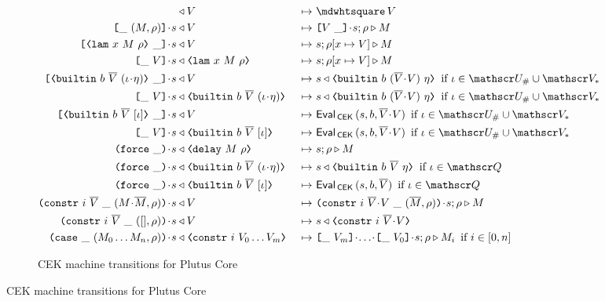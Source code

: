 \begin{figure}[H]
\begin{subfigure}[c]{\linewidth}
\begin{minipage}{\linewidth}
\begin{alignat*}{2}
[] & \return V                                    &~\mapsto~& \cekhalt{V}\\
\inAppLeftFrame{(M,\rho)}  \cons s            & \return V  &~\mapsto~& \inAppRightFrame{V} \cons s;\rho \compute M\\
\inAppRightFrame{\VLamAbs{x}{M}{\rho}} \cons s   & \return V  &~\mapsto~& s;\rho[x \mapsto V] \compute M\\
\inAppLeftFrame{V} \cons s   & \return \VLamAbs{x}{M}{\rho}  &~\mapsto~& s;\rho[x \mapsto V] \compute M\\
\inAppRightFrame{\VBuiltin{b}{\repetition{V}}{(\iota \cons \eta)}} \cons s & \return V &~\mapsto~&
                         s \return \VBuiltin{b}{(\repetition{V} \snoc V)}{\eta} \enskip \text{if $\iota \in \Unihash \cup \Var_*$}\\
\inAppLeftFrame{V} \cons s & \return \VBuiltin{b}{\repetition{V}}{(\iota \cons \eta)} &~\mapsto~&
                         s \return \VBuiltin{b}{(\repetition{V} \snoc V)}{\eta} \enskip \text{if $\iota \in \Unihash \cup \Var_*$}\\
\inAppRightFrame{\VBuiltin{b}{\repetition{V}}{[\iota]}} \cons s  & \return V &~\mapsto~&
                         \EvalCEK\,(s, b, \repetition{V}\snoc V) \enskip \text{if $\iota \in \Unihash \cup \Var_*$}\\
\inAppLeftFrame{V} \cons s & \return \VBuiltin{b}{\repetition{V}}{[\iota]} &~\mapsto~&
                         \EvalCEK\,(s, b, \repetition{V}\snoc V) \enskip \text{if $\iota \in \Unihash \cup \Var_*$}\\
\inForceFrame{} \cons s & \return \VDelay{M}{\rho}         &~\mapsto~& s;\rho \compute M\\
\inForceFrame{} \cons s & \return \VBuiltin{b}{\repetition{V}}{(\iota \cons \eta)} &~\mapsto~&
                         s \return \VBuiltin{b}{\repetition{V}}{\eta} \enskip \text{if $\iota \in \QVar$}\\
\inForceFrame{} \cons s & \return \VBuiltin{b}{\repetition{V}}{[\iota]}   &~\mapsto~&
                         \EvalCEK\,(s, b, \repetition{V}) \enskip \text{if $\iota \in \QVar$}\\
\inConstrFrame{i}{\repetition{V}}{(M \cons \repetition{M}, \rho)} \cons s & \return V   &~\mapsto~&
                         \inConstrFrame{i}{\repetition{V} \cons V}{(\repetition{M}, \rho)} \cons s;\rho \compute M \\
\inConstrFrame{i}{\repetition{V}}{([], \rho)} \cons s & \return V   &~\mapsto~&
                         s \return \VConstr{i}{\repetition{V} \cons V} \\
\inCaseFrame{(M_0 \ldots M_n, \rho)} \cons s & \return \VConstr{i}{V_0 \ldots V_m}   &~\mapsto~&
                         \inAppLeftFrame{V_m} \cons \ldots \cons \inAppLeftFrame{V_0} \cons s ;\rho \compute M_i \enskip \text{if $i \in [0,n]$}
\end{alignat*}
\end{minipage}
    \caption{CEK machine transitions for Plutus Core}
    \label{fig:untyped-cek-transitions}
\end{subfigure}


\end{figure}
